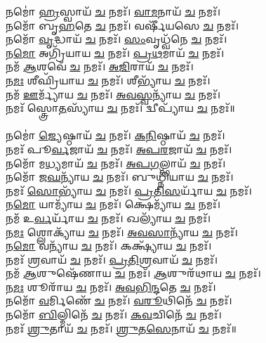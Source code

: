 𑌨𑌮𑍋॑ \ul{𑌹𑍍𑌰}\-𑌸𑍍𑌵𑌾𑌯᳴ \ul{𑌚} 𑌨𑌮𑌃᳴। \ul{𑌵𑌾}\-\-\ul{𑌮}\-𑌨𑌾𑌯᳴ \ul{𑌚} 𑌨𑌮𑌃᳴।\\
𑌨𑌮𑍋᳴ 𑌬𑍃\-\ul{𑌹}\-𑌤𑍇 \ul{𑌚} 𑌨𑌮𑌃᳴। 𑌵𑌰𑍍𑌷𑍀᳴𑌯𑌸𑍇 \ul{𑌚} 𑌨𑌮𑌃᳴। \\
𑌨𑌮𑍋᳴ \ul{𑌵𑍃}\-𑌦𑍍𑌧𑌾𑌯᳴ \ul{𑌚} 𑌨𑌮𑌃᳴। \ul{𑌸𑌂}\-𑌵𑍃𑌧𑍍𑌵᳴𑌨𑍇 \ul{𑌚} 𑌨𑌮𑌃᳴। \\
𑌨\-\ul{𑌮𑍋} 𑌅𑌗𑍍𑌰𑌿᳴𑌯𑌾𑌯 \ul{𑌚} 𑌨𑌮𑌃᳴। \ul{𑌪𑍍𑌰}\-\-\ul{𑌥}\-𑌮𑌾𑌯᳴ \ul{𑌚} 𑌨𑌮𑌃᳴। \\
𑌨𑌮᳴ \ul{𑌆}\-𑌶𑌵𑍇᳴ \ul{𑌚} 𑌨𑌮𑌃᳴। \ul{𑌅}\-\-\ul{𑌜𑌿}\-𑌰𑌾𑌯᳴ \ul{𑌚} 𑌨𑌮𑌃᳴।\\
𑌨\-\ul{𑌮𑌃} 𑌶𑍀𑌘𑍍𑌰𑌿᳴𑌯𑌾𑌯 \ul{𑌚} 𑌨𑌮𑌃᳴। 𑌶𑍀𑌭𑍍𑌯𑌾᳴𑌯 \ul{𑌚} 𑌨𑌮𑌃᳴। \\
𑌨𑌮᳴ \ul{𑌊}\-𑌰𑍍𑌮𑍍𑌯𑌾᳴𑌯 \ul{𑌚} 𑌨𑌮𑌃᳴। \ul{𑌅}\-\-\ul{𑌵}\-\-\ul{𑌸𑍍𑌵}\-𑌨𑍍𑌯𑌾᳴𑌯 \ul{𑌚} 𑌨𑌮𑌃᳴। \\
𑌨𑌮𑌃᳴ 𑌸𑍍𑌤𑍍𑌰𑍋\-\ul{𑌤}\-𑌸𑍍𑌯𑌾᳴𑌯 \ul{𑌚} 𑌨𑌮𑌃᳴। 𑌦𑍍𑌵𑍀𑌪𑍍𑌯𑌾᳴𑌯 \ul{𑌚} 𑌨𑌮𑌃᳴॥\\
\\
𑌨𑌮𑍋॑ \ul{𑌜𑍍𑌯𑍇}\-𑌷𑍍𑌠𑌾𑌯᳴ \ul{𑌚} 𑌨𑌮𑌃᳴। \ul{𑌕}\-\-\ul{𑌨𑌿}\-𑌷𑍍𑌠𑌾𑌯᳴ \ul{𑌚} 𑌨𑌮𑌃᳴। \\
𑌨𑌮𑌃᳴ 𑌪𑍂\-\ul{𑌰𑍍𑌵}\-𑌜𑌾𑌯᳴ \ul{𑌚} 𑌨𑌮𑌃᳴। \ul{𑌅}\-\-\ul{𑌪}\-\-\ul{𑌰}\-𑌜𑌾𑌯᳴ \ul{𑌚} 𑌨𑌮𑌃᳴। \\
𑌨𑌮𑍋᳴ 𑌮\-\ul{𑌧𑍍𑌯}\-𑌮𑌾𑌯᳴ \ul{𑌚} 𑌨𑌮𑌃᳴। \ul{𑌅}\-\-\ul{𑌪}\-\-\ul{𑌗}\-𑌲𑍍𑌭𑌾𑌯᳴ \ul{𑌚} 𑌨𑌮𑌃᳴। \\
𑌨𑌮𑍋᳴ 𑌜\-\ul{𑌘}\-𑌨𑍍𑌯𑌾᳴𑌯 \ul{𑌚} 𑌨𑌮𑌃᳴। 𑌬𑍁𑌧𑍍𑌨𑌿᳴𑌯𑌾𑌯 \ul{𑌚} 𑌨𑌮𑌃᳴।\\
𑌨𑌮𑌃᳴ \ul{𑌸𑍋}\-𑌭𑍍𑌯𑌾᳴𑌯 \ul{𑌚} 𑌨𑌮𑌃᳴। \ul{𑌪𑍍𑌰}\-\-\ul{𑌤𑌿}\-\-\ul{𑌸}\-𑌰𑍍𑌯𑌾᳴𑌯 \ul{𑌚} 𑌨𑌮𑌃᳴। \\
𑌨\-\ul{𑌮𑍋} 𑌯𑌾𑌮𑍍𑌯𑌾᳴𑌯 \ul{𑌚} 𑌨𑌮𑌃᳴। 𑌕𑍍𑌷𑍇𑌮𑍍𑌯𑌾᳴𑌯 \ul{𑌚} 𑌨𑌮𑌃᳴। \\
𑌨𑌮᳴ 𑌉\-\ul{𑌰𑍍𑌵}\-𑌰𑍍𑌯𑌾᳴𑌯 \ul{𑌚} 𑌨𑌮𑌃᳴। 𑌖𑌲𑍍𑌯𑌾᳴𑌯 \ul{𑌚} 𑌨𑌮𑌃᳴। \\
𑌨\-\ul{𑌮𑌃} 𑌶𑍍𑌲𑍋𑌕𑍍𑌯𑌾᳴𑌯 \ul{𑌚} 𑌨𑌮𑌃᳴। \ul{𑌅}\-\-\ul{𑌵}\-\-\ul{𑌸𑌾}\-𑌨𑍍𑌯𑌾᳴𑌯 \ul{𑌚} 𑌨𑌮𑌃᳴। \\
𑌨\-\ul{𑌮𑍋} 𑌵𑌨𑍍𑌯𑌾᳴𑌯 \ul{𑌚} 𑌨𑌮𑌃᳴। 𑌕𑌕𑍍𑌷𑍍𑌯𑌾᳴𑌯 \ul{𑌚} 𑌨𑌮𑌃᳴। \\
𑌨𑌮𑌃᳴ \ul{𑌶𑍍𑌰}\-𑌵𑌾𑌯᳴ \ul{𑌚} 𑌨𑌮𑌃᳴। \ul{𑌪𑍍𑌰}\-\-\ul{𑌤𑌿}\-\-\ul{𑌶𑍍𑌰}\-𑌵𑌾𑌯᳴ \ul{𑌚} 𑌨𑌮𑌃᳴। \\
𑌨𑌮᳴ \ul{𑌆}\-𑌶𑍁𑌷𑍇᳴𑌣𑌾𑌯 \ul{𑌚} 𑌨𑌮𑌃᳴। \ul{𑌆}\-𑌶𑍁𑌰᳴𑌥𑌾𑌯 \ul{𑌚} 𑌨𑌮𑌃᳴। \\
𑌨\-\ul{𑌮𑌃} 𑌶𑍂𑌰𑌾᳴𑌯 \ul{𑌚} 𑌨𑌮𑌃᳴। \ul{𑌅}\-\-\ul{𑌵}\-\-\ul{𑌭𑌿}\-\-\ul{𑌨𑍍𑌦}\-𑌤𑍇 \ul{𑌚} 𑌨𑌮𑌃᳴। \\
𑌨𑌮𑍋᳴ \ul{𑌵}\-𑌰𑍍𑌮𑌿𑌣𑍇᳴ \ul{𑌚} 𑌨𑌮𑌃᳴। \ul{𑌵}\-\-\ul{𑌰𑍂}\-𑌥𑌿𑌨𑍇᳴ \ul{𑌚} 𑌨𑌮𑌃᳴। \\
𑌨𑌮𑍋᳴ \ul{𑌬𑌿}\-𑌲𑍍𑌮𑌿𑌨𑍇᳴ \ul{𑌚} 𑌨𑌮𑌃᳴। \ul{𑌕}\-\-\ul{𑌵}\-𑌚𑌿𑌨𑍇᳴ \ul{𑌚} 𑌨𑌮𑌃᳴। \\
𑌨𑌮𑌃᳴ \ul{𑌶𑍍𑌰𑍁}\-𑌤𑌾𑌯᳴ \ul{𑌚} 𑌨𑌮𑌃᳴। \ul{𑌶𑍍𑌰𑍁}\-\-\ul{𑌤}\-\-\ul{𑌸𑍇}\-𑌨𑌾𑌯᳴ \ul{𑌚} 𑌨𑌮𑌃᳴॥ \\
